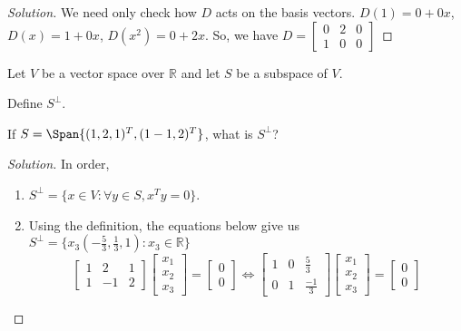\documentclass[crop=false,class=book]{standalone}
\begin{document}
\begin{proof}[Solution]
We need only check how $D$ acts on the basis vectors. $D(1) = 0+0x$, $D(x) = 1+0x$, $D(x^2) = 0+2x$. So, we have $D = \begin{bmatrix} 0 & 2 & 0 \\ 1 & 0 & 0 \end{bmatrix}$
\end{proof}
\begin{problem}
Let $V$ be a vector space over $\mathbb{R}$ and let $S$ be a subspace of $V$.
\begin{enumerate}
\begin{multicols}{2}
    \item Define $S^{\perp}$.
    \item If $S=\Span\{ (1,2,1)^T, (1-1,2)^T\}$, what is $S^{\perp}$?
\end{multicols}
\end{enumerate}
\end{problem}
\begin{proof}[Solution]
In order,
\begin{enumerate}
    \item $S^{\perp} = \{x\in V: \forall y\in S, x^T y = 0\}$.
    \item Using the definition, the equations below give us $S^{\perp}=\{x_{3}(-\frac{5}{3},\frac{1}{3},1):x_{3}\in \mathbb{R}\}$
    \begin{equation*}
        \begin{bmatrix}1&2&1\\1&-1&2\end{bmatrix}\begin{bmatrix}x_1\\x_2\\x_3\end{bmatrix}=\begin{bmatrix}0\\0\end{bmatrix}\Leftrightarrow\begin{bmatrix}1&0&\frac{5}{3} \\0&1&\frac{-1}{3}\end{bmatrix}\begin{bmatrix}x_1\\x_2\\x_3\end{bmatrix}=\begin{bmatrix}0\\0\end{bmatrix}
    \end{equation*}
\end{enumerate}
\end{proof}
\end{document}
